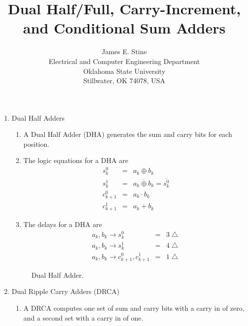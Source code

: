 \documentclass[times, twocolumn, 10pt]{article}
\begin{document}
\title{Dual Half/Full, Carry-Increment, and Conditional Sum Adders}
\author{James E. Stine \\
Electrical and Computer Engineering Department\\
Oklahoma State University \\
Stillwater, OK 74078, USA}
\date{}

\maketitle


\begin{enumerate}
\item Dual Half Adders
  \begin{enumerate}
  \item A Dual Half Adder (DHA) generates the sum and carry bits for
    each position. 
  \item The logic equations for a DHA are 
    \begin{eqnarray*}
      s_{k}^{0}   & = & a_{k} \oplus b_{k} \\
      s_{k}^{1}   & = & \overline{a_{k} \oplus b_{k}} = \overline{s_{k}^{0}} \\
      c_{k+1}^{0} & = & a_{k} \cdot b_{k} \\
      c_{k+1}^{1} & = & a_{k} + b_{k}
    \end{eqnarray*}
  \item The delays for a DHA are  
    \begin{eqnarray*}
      a_{k}, b_{k} \rightarrow s_{k}^{0} & = & 3 \bigtriangleup \\
      a_{k}, b_{k} \rightarrow s_{k}^{1} & = & 4 \bigtriangleup \\
      a_{k}, b_{k} \rightarrow c_{k+1}^{0}, c_{k+1}^{1} & = & 1 \bigtriangleup 
    \end{eqnarray*}
  \end{enumerate}
  \begin{figure*} [h!]
    \begin{center}
      \setlength{\unitlength}{0.0105in}%
    \end{center}
    \label{dha.fig}
    \caption{Dual Half Adder.}
  \end{figure*}
\item Dual Ripple Carry Adders (DRCA) 
  \begin{enumerate}
  \item A DRCA computes one set of sum and carry bits with a carry in 
    of zero, and a second set with a carry in of one. 


\end{enumerate}
\end{enumerate}
\end{document}
